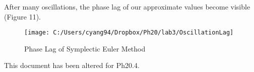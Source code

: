 \documentclass[english]{article}
\begin{document}
After many oscillations, the phase lag of our approximate values become
visible (Figure 11).

\begin{figure}[H]


\caption{Phase Lag of Symplectic Euler Method}


\noindent \begin{centering}
\texttt{[image: C:/Users/cyang94/Dropbox/Ph20/lab3/OscillationLag]}
\par\end{centering}

\end{figure}

This document has been altered for Ph20.4.
\end{document}
